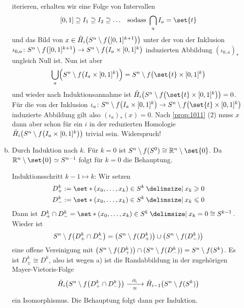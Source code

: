 \begin{beweis}[{name={von \autoref{satz:1010}}}]
\begin{enumerate}[a)]
		iterieren, erhalten wir eine Folge von Intervallen
		\[
			[0,1] \supseteq I_1 \supseteq I_2 \supseteq \ldots \enspace\text{ sodass } \bigcap_a I_a = \set{t} 
		\]
		und das Bild von $x \in \tilde{H}_i \enbrace*{S^n \setminus f \enbrace*{[0,1]^{k+1}}}$ unter der von der Inklusion 
		$\iota_{0,a} \colon S^n \setminus f \enbrace*{[0,1]^{k+1}} \to S^n \setminus f \enbrace*{I_a \times [0,1]^k}$ induzierten Abbildung 
		$(\iota_{0,a})_*$ ungleich Null 
		ist. Nun ist aber 
		\[
			\bigcup_a \enbrace[\Big]{S^n \setminus f \enbrace*{I_a \times [0,1]^k}} = S^n \setminus f \enbrace[\big]{\set{t} \times [0,1]^k }  
		\]
		und wieder nach Induktionsannahme ist $\tilde{H}_i \enbrace*{S^n \setminus f \enbrace*{\set{t} \times [0,1]^k}} =0$.  Für die von der Inklusion
		$\iota_a \colon S^n \setminus f \enbrace*{I_a \times [0,1]^k}  \to S^n \setminus f \enbrace*{\set{t} \times [0,1]^k}$ induzierte Abbildung gilt also
		$(\iota_a)_*(x)=0$. 
		Nach \autoref{prop:1011} (2) muss $x$ dann aber schon für ein $i$ in der reduzierten Homologie $\tilde{H}_i \enbrace*{S^n \setminus f \enbrace*{I_a \times [0,1]^k} }$ trivial sein. Widerspruch!
		\item Durch Induktion nach $k$. Für $k=0$ ist $S^n \setminus f(S^0) \cong \mathbb{R}^n \setminus \set{0}$. Da $\mathbb{R}^n \setminus \set{0} \simeq S^{n-1}$
		folgt für $k=0$ die Behauptung.
	
		Induktionsschritt $k-1 \mapsto k$: Wir setzen 
		\begin{align*}
			D^k_+ &:= \set*{(x_0,\ldots ,x_k) \in S^k \given x_k \ge 0} \\
			D^k_- &:= \set*{(x_0, \ldots , x_k) \in S^k \given x_k \le 0}
		\end{align*}
		Dann ist 
		$D^k_+ \cap D^k_- = \set*{(x_0, \ldots ,x_k)\in S^k \given x_k=0} \cong S^{k-1}$. Wieder ist 
		\[
			S^n \setminus f \enbrace*{D^k_+ \cap D^k_-} =\enbrace*{S^n \setminus f(D^k_+)} \cup \enbrace*{S^n \setminus f(D^k_-)}  
		\]
		eine offene Vereinigung mit $\enbrace*{S^n \setminus f(D^k_+)} \cap (S^n \setminus f(D^k_-)) = S^n \setminus f(S^k)$. Es ist $D^k_{\pm} \cong D^{k}$, also ist
		wegen a) ist die Randabbildung in der zugehörigen Mayer-Vietoris-Folge
		\[
			\tilde{H}_i \enbrace*{S^n \setminus f \enbrace*{D^k_+ \cap D^k_-} } \xrightarrow[\cong]{\minwidthbox{\partial_i}{2em}} \tilde{H}_{i-1} \enbrace*{S^n \setminus f(S^k)}   
		\]
		ein Isomorphismus. Die Behauptung folgt dann per Induktion. \qedhere
	\end{enumerate}
\end{beweis}

